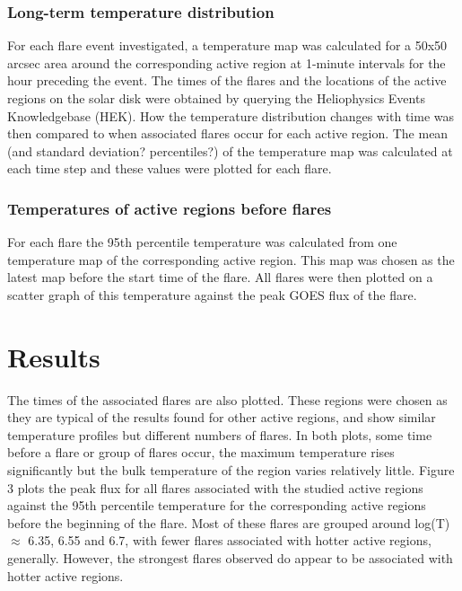 \documentclass{article}
\begin{document}
\subsubsection{Long-term temperature distribution}
For each flare event investigated, a temperature map was calculated for a 50x50 arcsec area around the corresponding active region at 1-minute intervals for the hour preceding the event.
The times of the flares and the locations of the active regions on the solar disk were obtained by querying the Heliophysics Events Knowledgebase (HEK).
How the temperature distribution changes with time was then compared to when associated flares occur for each active region.
The mean (and standard deviation? percentiles?) of the temperature map was calculated at each time step and these values were plotted for each flare.

\subsubsection{Temperatures of active regions before flares}
For each flare the 95th percentile temperature was calculated from one temperature map of the corresponding active region.
This map was chosen as the latest map before the start time of the flare. %
All flares were then plotted on a scatter graph of this temperature against the peak GOES flux of the flare.

\section{Results}
The times of the associated flares are also plotted.
These regions were chosen as they are typical of the results found for other active regions, and show similar temperature profiles but different numbers of flares.
In both plots, some time before a flare or group of flares occur, the maximum temperature rises significantly but the bulk temperature of the region varies relatively little.
Figure 3 plots the peak flux for all flares associated with the studied active regions against the 95th percentile temperature for the corresponding active regions before the beginning of the flare.
Most of these flares are grouped around log(T) $\approx$ 6.35, 6.55 and 6.7, with fewer flares associated with hotter active regions, generally.
However, the strongest flares observed do appear to be associated with hotter active regions.
\end{document}
